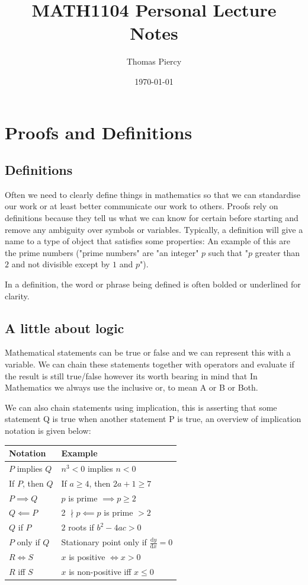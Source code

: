 \documentclass[12pt]{article}
\title{\textbf{MATH1104 Personal Lecture Notes}}
\author{Thomas Piercy}
\date{\today{}}
\begin{document}
\maketitle
\hrulefill
{}
\tableofcontents
\newpage
\section{Proofs and Definitions}
\subsection*{Definitions}
Often we need to clearly define things in mathematics so that we can standardise our work or at least better communicate our work to others. Proofs rely on definitions because they tell us what we can know for certain before starting and remove any ambiguity over symbols or variables. Typically, a definition will give a name to a type of object that satisfies some properties: An example of this are the prime numbers ("prime numbers" are "an integer" \(p\) such that "\(p\) greater than \(2\) and not divisible except by \(1\) and \(p\)").

In a definition, the word or phrase being defined is often bolded or underlined for clarity.
\subsection*{A little about logic}
Mathematical statements can be true or false and we can represent this with a variable. We can chain these statements together with operators and evaluate if the result is still true/false however its worth bearing in mind that In Mathematics we always use the inclusive or, to mean A or B or Both.

We can also chain statements using implication, this is asserting that some statement Q is true when another statement P is true, an overview of implication notation is given below:
\begin{table}[H]
    \begin{tabular}{|l|l|}
        \hline
        \textbf{Notation} & \textbf{Example} \\ \hline
       \(P\) implies \(Q\) & \(n^3<0\) implies \(n<0\) \\ \hline
        If \(P\), then \(Q\) & If \(a \geq 4\), then \(2a + 1 \geq 7\) \\ \hline
       \(P \implies Q\) & \(p\) is prime \(\implies p \geq 2\) \\ \hline
        \(Q \impliedby P\) & 2 \(\nmid p \impliedby p\) is prime \(> 2\) \\ \hline
        \(Q\) if \(P\) & \(2\) roots if \(b^2-4ac>0\) \\ \hline
        \(P\) only if \(Q\) & Stationary point only if \(\frac{\text{d}y}{\text{d}x}=0\) \\ \hline      
        \(R \iff S\) & \(x\) is positive \(\iff x>0\) \\ \hline
        \(R\) iff \(S\) & \(x\) is non-positive iff \(x \leq 0\) \\ \hline
    \end{tabular}
\end{table}
\end{document}
